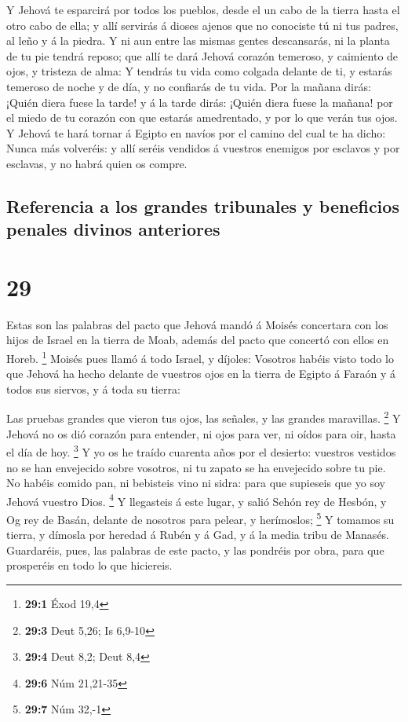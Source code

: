  Y Jehová te esparcirá por todos los pueblos, desde el un
cabo de la tierra hasta el otro cabo de ella; y allí servirás á dioses
ajenos que no conociste tú ni tus padres, al leño y á la piedra.
 Y ni aun entre las mismas gentes descansarás, ni la planta
de tu pie tendrá reposo; que allí te dará Jehová corazón temeroso, y
caimiento de ojos, y tristeza de alma:  Y tendrás tu vida
como colgada delante de ti, y estarás temeroso de noche y de día, y no
confiarás de tu vida.  Por la mañana dirás: ¡Quién diera
fuese la tarde! y á la tarde dirás: ¡Quién diera fuese la mañana! por el
miedo de tu corazón con que estarás amedrentado, y por lo que verán tus
ojos.  Y Jehová te hará tornar á Egipto en navíos por el
camino del cual te ha dicho: Nunca más volveréis: y allí seréis vendidos
á vuestros enemigos por esclavos y por esclavas, y no habrá quien os
compre.

\hypertarget{referencia-a-los-grandes-tribunales-y-beneficios-penales-divinos-anteriores}{%
\subsection{Referencia a los grandes tribunales y beneficios penales
divinos
anteriores}\label{referencia-a-los-grandes-tribunales-y-beneficios-penales-divinos-anteriores}}

\hypertarget{section-28}{%
\section{29}\label{section-28}}

 Estas son las palabras del pacto que Jehová mandó á Moisés
concertara con los hijos de Israel en la tierra de Moab, además del
pacto que concertó con ellos en Horeb. \footnote{\textbf{29:1} Éxod 19,4}
 Moisés pues llamó á todo Israel, y díjoles: Vosotros habéis
visto todo lo que Jehová ha hecho delante de vuestros ojos en la tierra
de Egipto á Faraón y á todos sus siervos, y á toda su tierra:

 Las pruebas grandes que vieron tus ojos, las señales, y las
grandes maravillas. \footnote{\textbf{29:3} Deut 5,26; Is 6,9-10}
 Y Jehová no os dió corazón para entender, ni ojos para ver,
ni oídos para oir, hasta el día de hoy. \footnote{\textbf{29:4} Deut
  8,2; Deut 8,4}  Y yo os he traído cuarenta años por el
desierto: vuestros vestidos no se han envejecido sobre vosotros, ni tu
zapato se ha envejecido sobre tu pie.  No habéis comido pan,
ni bebisteis vino ni sidra: para que supieseis que yo soy Jehová vuestro
Dios. \footnote{\textbf{29:6} Núm 21,21-35}  Y llegasteis á
este lugar, y salió Sehón rey de Hesbón, y Og rey de Basán, delante de
nosotros para pelear, y herímoslos; \footnote{\textbf{29:7} Núm 32,-1}
 Y tomamos su tierra, y dímosla por heredad á Rubén y á Gad,
y á la media tribu de Manasés.  Guardaréis, pues, las
palabras de este pacto, y las pondréis por obra, para que prosperéis en
todo lo que hiciereis.

